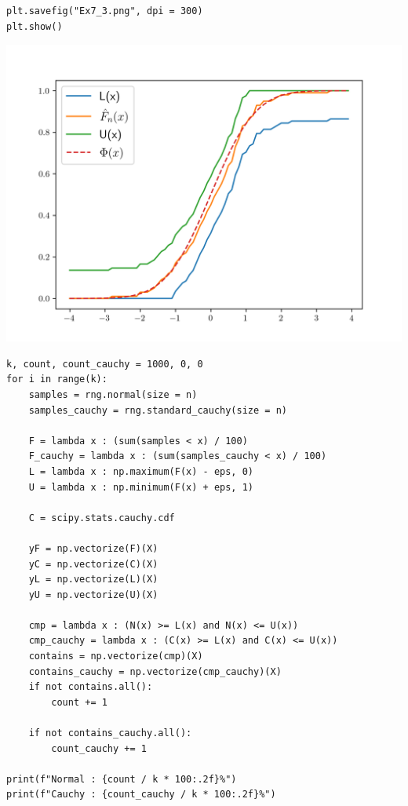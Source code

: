 \documentclass{article}
\begin{document}
\begin{enumerate}
\begin{itemize}
\begin{verbatim}
plt.savefig("Ex7_3.png", dpi = 300)
plt.show()
			\end{verbatim}
			\begin{center}
				\includegraphics[width=\linewidth]{7-Estimating_the_CDF_and_Statistical_Functionals/Ex7_3.png}
			\end{center}
			\begin{verbatim}
k, count, count_cauchy = 1000, 0, 0
for i in range(k):
    samples = rng.normal(size = n)
    samples_cauchy = rng.standard_cauchy(size = n)

    F = lambda x : (sum(samples < x) / 100)
    F_cauchy = lambda x : (sum(samples_cauchy < x) / 100)
    L = lambda x : np.maximum(F(x) - eps, 0)
    U = lambda x : np.minimum(F(x) + eps, 1)

    C = scipy.stats.cauchy.cdf

    yF = np.vectorize(F)(X)
    yC = np.vectorize(C)(X)
    yL = np.vectorize(L)(X)
    yU = np.vectorize(U)(X)

    cmp = lambda x : (N(x) >= L(x) and N(x) <= U(x))
    cmp_cauchy = lambda x : (C(x) >= L(x) and C(x) <= U(x))
    contains = np.vectorize(cmp)(X)
    contains_cauchy = np.vectorize(cmp_cauchy)(X)
    if not contains.all():
        count += 1

    if not contains_cauchy.all():
        count_cauchy += 1

print(f"Normal : {count / k * 100:.2f}%")
print(f"Cauchy : {count_cauchy / k * 100:.2f}%")


\end{verbatim}
\end{itemize}
\end{enumerate}
\end{document}
